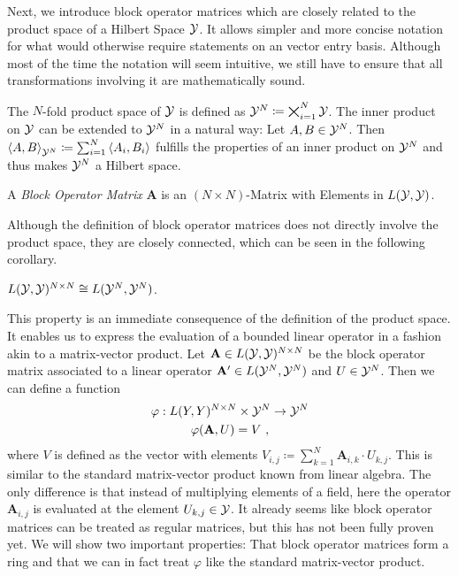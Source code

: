 Next, we introduce block operator matrices which are closely related to the product space of a Hilbert Space $\mathcal{Y}$.
It allows simpler and more concise notation for what would otherwise require statements on an vector entry basis.
Although most of the time the notation will seem intuitive, we still have to ensure that all transformations involving it are mathematically sound.

The $N$-fold product space of $\mathcal{Y}$ is defined as $\mathcal{Y}^N \coloneqq \bigtimes_{i=1}^N \mathcal{Y}$.
The inner product on $\mathcal{Y}$ can be extended to $\mathcal{Y}^N$ in a natural way:
Let $A, B \in \mathcal{Y}^N$.
Then $\left < A, B \right >_{\mathcal{Y}^N} \coloneqq \sum_{i=1}^{N} \left <A_i, B_i \right >$ fulfills the properties of an inner product on $\mathcal{Y}^N$ and thus makes $\mathcal{Y}^N$ a Hilbert space.

\begin{definition}
	A \emph{Block Operator Matrix} $\mathbf{A}$ is an $(N \times N)$-Matrix with Elements in $L(\mathcal{Y}, \mathcal{Y})$.
\end{definition}
Although the definition of block operator matrices does not directly involve the product space, they are closely connected, which can be seen in the following corollary.
\begin{corollary}
  $L(\mathcal{Y}, \mathcal{Y})^{N \times N} \cong L(\mathcal{Y}^N, \mathcal{Y}^N)$.
\end{corollary}
This property is an immediate consequence of the definition of the product space.
It enables us to express the evaluation of a bounded linear operator in a fashion akin to a matrix-vector product.
Let $\mathbf{A} \in L(\mathcal{Y}, \mathcal{Y})^{N\times N}$ be the block operator matrix associated to a linear operator $\mathbf{A}^\prime \in L(\mathcal{Y}^N, \mathcal{Y}^N)$ and $U \in \mathcal{Y}^N$.
Then we can define a function
\begin{gather}
	\varphi: L(Y, Y)^{N\times N} \times \mathcal{Y}^N \rightarrow \mathcal{Y}^N \\
	\varphi(\mathbf{A}, U) = V \ ,
\end{gather}
where $V$ is defined as the vector with elements $V_{i, j} \coloneqq \sum_{k = 1}^N \mathbf{A}_{i,k} \cdot U_{k, j}$.
This is similar to the standard matrix-vector product known from linear algebra.
The only difference is that instead of multiplying elements of a field, here the operator $\mathbf{A}_{i, j}$ is evaluated at the element $U_{k, j} \in \mathcal{Y}$.
It already seems like block operator matrices can be treated as regular matrices, but this has not been fully proven yet.
We will show two important properties: That block operator matrices form a ring and that we can in fact treat $\varphi$ like the standard matrix-vector product.

